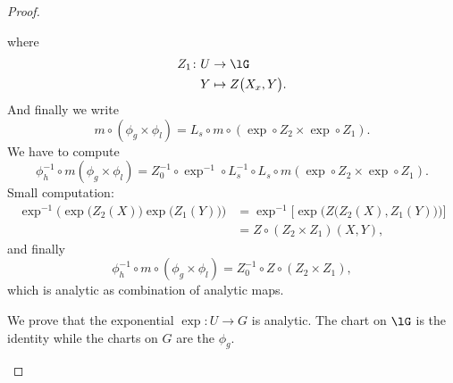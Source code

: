 \begin{proof}
\begin{subproof}
		where
		\begin{equation}
			\begin{aligned}
				Z_1\colon U & \to \lG                     \\
				Y           & \mapsto Z\big( X_x,Y \big).
			\end{aligned}
		\end{equation}
		And finally we write
		\begin{equation}
			m\circ(\phi_g\times \phi_l)=L_s\circ m\circ(\exp\circ Z_2\times \exp\circ Z_1).
		\end{equation}
		We have to compute
		\begin{equation}
			\phi_h^{-1}\circ m(\phi_g\times \phi_l)=Z_0^{-1}\circ\exp^{-1}\circ L_s^{-1}\circ L_s\circ m(\exp\circ Z_2\times \exp\circ Z_1).
		\end{equation}
		Small computation:
		\begin{subequations}
			\begin{align}
				\exp^{-1}\Big( \exp\big( Z_2(X) \big)\exp\big( Z_1(Y) \big) \Big) & =\exp^{-1}\Big[ \exp\Big( Z\big( Z_2(X),Z_1(Y) \big)  \Big) \Big] \\
				                                                                  & = Z\circ(Z_2\times Z_1)(X,Y),
			\end{align}
		\end{subequations}
		and finally
		\begin{equation}
			\phi_h^{-1}\circ m\circ(\phi_g\times \phi_l)=Z_0^{-1}\circ Z\circ(Z_2\times Z_1),
		\end{equation}
		which is analytic as combination of analytic maps.

		\spitem[Exponential]
		We prove that the exponential \(\exp \colon U\to G  \) is analytic. The chart on \( \lG\) is the identity while the charts on \( G\) are the \( \phi_g\).


\end{subproof}
\end{proof}
